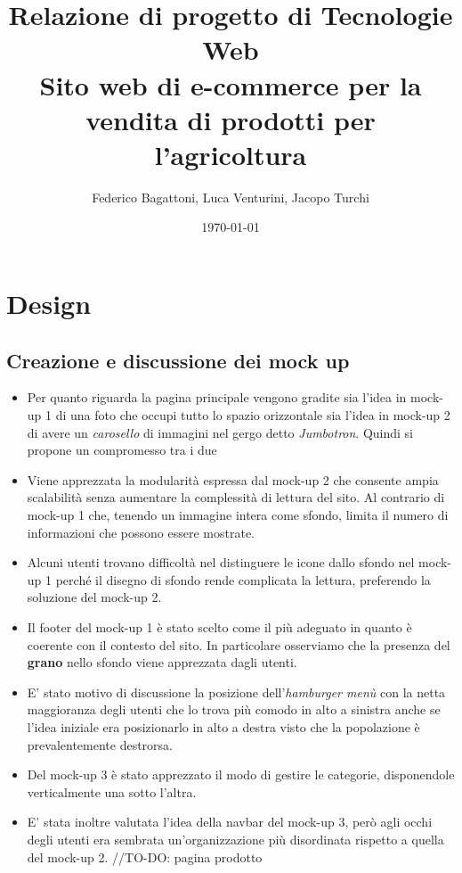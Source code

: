 \documentclass{report}
\title{
    Relazione di progetto di Tecnologie Web\\
    \large Sito web di e-commerce per la vendita di prodotti per l'agricoltura
}
\author{Federico Bagattoni, Luca Venturini, Jacopo Turchi}
\date{\today}
\begin{document}
\maketitle

\tableofcontents

\chapter{Design}

\section{Creazione e discussione dei mock up}
\begin{itemize}
    \item {Per quanto riguarda la pagina principale vengono gradite sia l'idea in mock-up 1 di una foto che occupi tutto lo spazio orizzontale sia l'idea in mock-up 2 di avere un \textit{carosello} di immagini nel gergo detto \textit{Jumbotron}. Quindi si propone un compromesso tra i due}
    \item {Viene apprezzata la modularità espressa dal mock-up 2 che consente ampia scalabilità senza aumentare la complessità di lettura del sito. Al contrario di mock-up 1 che, tenendo un immagine intera come sfondo, limita il numero di informazioni che possono essere mostrate.}
    \item {Alcuni utenti trovano difficoltà nel distinguere le icone dallo sfondo nel mock-up 1 perché il disegno di sfondo rende complicata la lettura, preferendo la soluzione del mock-up 2.}
    \item {Il footer del mock-up 1 è stato scelto come il più adeguato in quanto è coerente con il contesto del sito. In particolare osserviamo che la presenza del \textbf{grano} nello sfondo viene apprezzata dagli utenti.}
    \item {E' stato motivo di discussione la posizione dell'\textit{hamburger menù} con la netta maggioranza degli utenti che lo trova più comodo in alto a sinistra anche se l'idea iniziale era posizionarlo in alto a destra visto che la popolazione è prevalentemente destrorsa.}
    \item {Del mock-up 3 è stato apprezzato il modo di gestire le categorie, disponendole verticalmente una sotto l'altra.}
    \item {E' stata inoltre valutata l'idea della navbar del mock-up 3, però agli occhi degli utenti era sembrata un'organizzazione più disordinata rispetto a quella del mock-up 2.}
    //TO-DO: pagina prodotto
\end{itemize}
\end{document}
